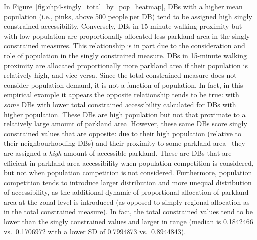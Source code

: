 \documentclass[
11pt, %
oneside, %
english, %
singlespacing, %
]{macthesis} %
\begin{document}
In Figure~\ref{fig:chp4-singly_total_by_pop_heatmap}, DBs with a higher mean population (i.e., pinks, above 500 people per DB) tend to be assigned high singly constrained accessibility. Conversely, DBs in 15-minute walking proximity but with low population are proportionally allocated less parkland area in the singly constrained measures. This relationship is in part due to the consideration and role of population in the singly constrained measure. DBs in 15-minute walking proximity are allocated proportionally more parkland area if their population is relatively high, and vice versa. Since the total constrained measure does not consider population demand, it is not a function of population. In fact, in this empirical example it appears the opposite relationship tends to be true: with \emph{some} DBs with lower total constrained accessibility calculated for DBs with higher population. These DBs are high population but not that proximate to a relatively large amount of parkland area. However, these same DBs score singly constrained values that are opposite: due to their high population (relative to their neighbourhooding DBs) and their proximity to some parkland area --they are assigned a \emph{high} amount of accessible parkland. These are DBs that are efficient in parkland area accessibility when population competition is considered, but not when population competition is not considered. Furthermore, population competition tends to introduce larger distribution and more unequal distribution of accessibility, as the additional dynamic of proportional allocation of parkland area at the zonal level is introduced (as opposed to simply regional allocation as in the total constrained measure). In fact, the total constrained values tend to be lower than the singly constrained values and larger in range (median is 0.1842466 vs.~0.1706972 with a lower SD of 0.7994873 vs.~0.8944843).
\end{document}
